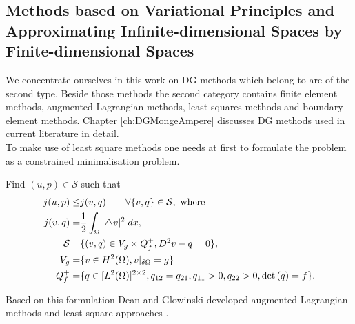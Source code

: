 \subsection{Methods based on Variational Principles and Approximating Infinite-dimensional Spaces by Finite-dimensional Spaces}
 We concentrate ourselves in this work on DG methods which belong to are of the second type. Beside those methods the second category contains finite element methods, augmented Lagrangian methods, least squares methods and boundary element methods. Chapter \ref{ch:DGMongeAmpere} discusses DG methods used in current literature in detail.\\
To make use of least square methods one needs at first to formulate the \MA problem as a constrained minimalisation problem.
\begin{definition}
Find $(u,p) \in \mathcal{S}$ such that
\begin{align}
	j(u,p) \leq& j(v,q) \qquad \forall \{v,q\} \in \mathcal{S}, \text{ where }\\
	j(v,q)  =& \frac 1 2 \int_{\Omega} {{|\triangle v |^2}\;dx}, \\
	\mathcal{S} =& \{(v,q)\in V_g \times Q^+_f, D^2v-q =0\},\\
	V_g =& \{v \in H^2(\Omega), v \arrowvert_{\delta \Omega}=g\} \\
	Q^+_f =& \{q \in [L^2(\Omega)]^{2\times2} , q_{12} =q_{21},  q_{11} > 0,q_{22} > 0, \det{\left(q\right)} = f\}.
\end{align}

\end{definition}
Based on this formulation Dean and Glowinski developed augmented Lagrangian methods and least square approaches \cite{DG2004,DG2006,DG2006a}.

